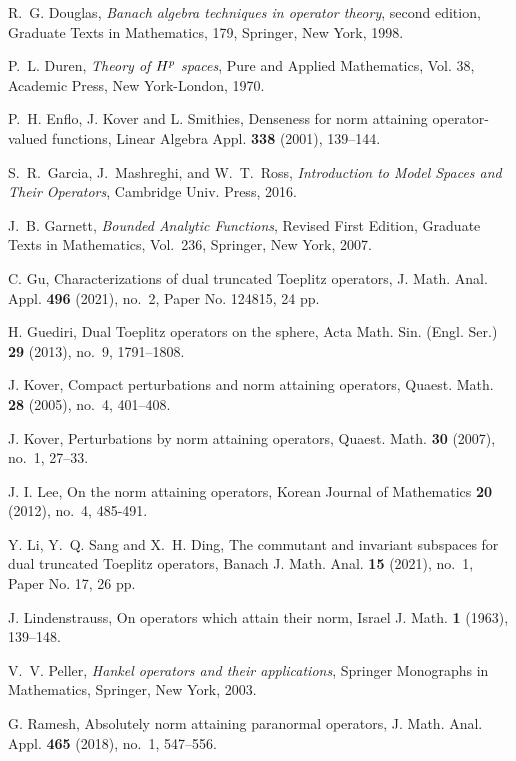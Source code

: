 \documentclass[12pt]{amsart}
\theoremstyle{definition}
\theoremstyle{remark}
\numberwithin{equation}{section}
\begin{document}
\begin{thebibliography}{}
R.~G. Douglas, {\it Banach algebra techniques in operator theory}, second edition, Graduate Texts in Mathematics, 179, Springer, New York, 1998.


P.~L. Duren, {\it Theory of $H\sp{p}$ spaces}, Pure and Applied Mathematics, Vol. 38, Academic Press, New York-London, 1970.

P.~H. Enflo, J. Kover and L. Smithies, Denseness for norm attaining operator-valued functions, Linear Algebra Appl. {\bf 338} (2001), 139--144.





S.~R.~Garcia, J.~Mashreghi, and W.~T.~Ross, \emph{Introduction to Model Spaces and Their Operators}, Cambridge Univ. Press, 2016.

J.~B. Garnett, \emph{Bounded Analytic Functions}, Revised First Edition, Graduate Texts in Mathematics, Vol.~236, Springer, New York, 2007.


 C. Gu, Characterizations of dual truncated Toeplitz operators, J. Math. Anal. Appl. {\bf 496} (2021), no.~2, Paper No. 124815, 24 pp.

H. Guediri, Dual Toeplitz operators on the sphere, Acta Math. Sin. (Engl. Ser.) {\bf 29} (2013), no.~9, 1791--1808.


J. Kover, Compact perturbations and norm attaining operators, Quaest. Math. {\bf 28} (2005), no.~4, 401--408.

J. Kover, Perturbations by norm attaining operators, Quaest. Math. {\bf 30} (2007), no.~1, 27--33.

J. I. Lee, On the norm attaining operators,  Korean Journal of Mathematics {\bf 20} (2012), no.~4, 485-491.
    
 Y. Li, Y.~Q. Sang and X.~H. Ding, The commutant and invariant subspaces for dual truncated Toeplitz operators, Banach J. Math. Anal. {\bf 15} (2021), no.~1, Paper No. 17, 26 pp.

J. Lindenstrauss, On operators which attain their norm, Israel J. Math. {\bf 1} (1963), 139--148.



V.~V. Peller, {\it Hankel operators and their applications}, Springer Monographs in Mathematics, Springer, New York, 2003. 

G. Ramesh, Absolutely norm attaining paranormal operators, J. Math. Anal. Appl. {\bf 465} (2018), no.~1, 547--556.



\end{thebibliography}
\end{document}
